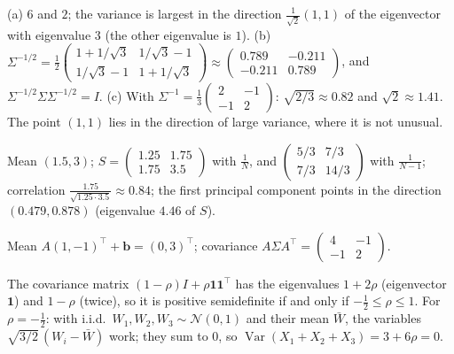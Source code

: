 \documentclass[11pt]{article}
\DeclareMathOperator{\Var}{Var}
\begin{document}
\begin{description}[leftmargin=0pt, itemsep=0.3em]
    \item[\ref{pr:cov-whitening}.] (a) $6$ and $2$; the variance is largest in the direction $\frac{1}{\sqrt{2}}(1, 1)$ of the eigenvector with eigenvalue $3$ (the other eigenvalue is $1$). (b) $\Sigma^{-1/2} = \frac{1}{2}\begin{pmatrix} 1 + 1/\sqrt{3} & 1/\sqrt{3} - 1 \\ 1/\sqrt{3} - 1 & 1 + 1/\sqrt{3} \end{pmatrix} \approx \begin{pmatrix} 0.789 & -0.211 \\ -0.211 & 0.789 \end{pmatrix}$, and $\Sigma^{-1/2}\Sigma\Sigma^{-1/2} = I$. (c) With $\Sigma^{-1} = \frac{1}{3}\begin{pmatrix} 2 & -1 \\ -1 & 2 \end{pmatrix}$: $\sqrt{2/3} \approx 0.82$ and $\sqrt{2} \approx 1.41$. The point $(1, 1)$ lies in the direction of large variance, where it is not unusual.
    \item[\ref{pr:sample-cov}.] Mean $(1.5, 3)$; $S = \begin{pmatrix} 1.25 & 1.75 \\ 1.75 & 3.5 \end{pmatrix}$ with $\frac{1}{N}$, and $\begin{pmatrix} 5/3 & 7/3 \\ 7/3 & 14/3 \end{pmatrix}$ with $\frac{1}{N - 1}$; correlation $\frac{1.75}{\sqrt{1.25 \cdot 3.5}} \approx 0.84$; the first principal component points in the direction $(0.479, 0.878)$ (eigenvalue $4.46$ of $S$).
    \item[\ref{pr:affine-cov}.] Mean $A(1, -1)^\top + \mathbf{b} = (0, 3)^\top$; covariance $A\Sigma A^\top = \begin{pmatrix} 4 & -1 \\ -1 & 2 \end{pmatrix}$.
    \item[\ref{pr:equicorrelation}.] The covariance matrix $(1 - \rho)I + \rho\mathbf{1}\mathbf{1}^\top$ has the eigenvalues $1 + 2\rho$ (eigenvector $\mathbf{1}$) and $1 - \rho$ (twice), so it is positive semidefinite if and only if $-\frac{1}{2} \leq \rho \leq 1$. For $\rho = -\frac{1}{2}$: with i.i.d.\ $W_1, W_2, W_3 \sim \mathcal{N}(0, 1)$ and their mean $\bar W$, the variables $\sqrt{3/2}\,(W_i - \bar W)$ work; they sum to $0$, so $\Var(X_1 + X_2 + X_3) = 3 + 6\rho = 0$.
\end{description}
\end{document}
